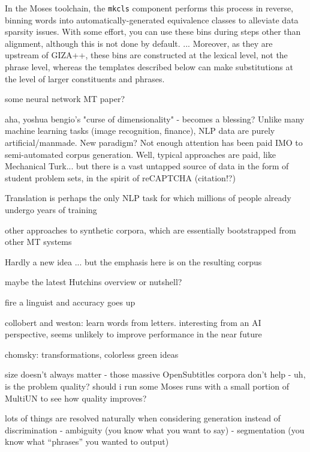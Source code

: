 In the Moses toolchain, the {\small \tt mkcls} component  performs this process in reverse, binning words into automatically-generated equivalence classes to alleviate data sparsity issues.
With some effort, you can use these bins during steps other than alignment, although this is not done by default.
...
Moreover, as they are upstream of GIZA++, these bins are constructed at the lexical level, not the phrase level, whereas the templates described below can make substitutions at the level of larger constituents and phrases.


some neural network MT paper?

aha, yoshua bengio's "curse of dimensionality" - becomes a blessing?  
Unlike many machine learning tasks (image recognition, finance), NLP data are purely artificial/manmade.  New paradigm?  Not enough attention has been paid IMO to semi-automated corpus generation.  Well, typical approaches are paid, like Mechanical Turk... but there is a vast untapped source of data in the form of student problem sets, in the spirit of reCAPTCHA (citation!?)

Translation is perhaps the only NLP task for which millions of people already undergo years of training

other approaches to synthetic corpora, which are essentially bootstrapped from other MT systems

Hardly a new idea ... but the emphasis here is on the resulting corpus




maybe the latest Hutchins overview or nutshell?

fire a linguist and accuracy goes up

collobert and weston: learn words from letters. interesting from an AI perspective, seems unlikely to improve performance in the near future

chomsky: transformations, colorless green ideas


size doesn't always matter - those massive OpenSubtitles corpora don't help
- uh, is the problem quality? should i run some Moses runs with a small portion of MultiUN to see how quality improves?

lots of things are resolved naturally when considering generation instead of discrimination
- ambiguity (you know what you want to say)
- segmentation (you know what ``phrases'' you wanted to output)

